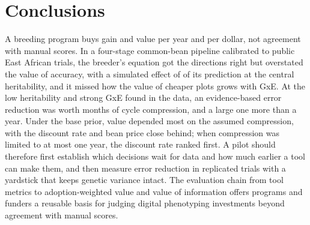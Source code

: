 \section{Conclusions}\label{sec:conclusions}

A breeding program buys gain and value per year and per dollar, not agreement with manual scores. In a four-stage common-bean pipeline calibrated to public East African trials, the breeder's equation got the directions right but overstated the value of accuracy, with a simulated effect of \NumBEratioHtwoTen of its prediction at the central heritability, and it missed how the value of cheaper plots grows with GxE. At the low heritability and strong GxE found in the data, an evidence-based error reduction was worth \NumExchMoHtwoTenErrTen months of cycle compression, and a large one more than a year. Under the base prior, value depended most on the assumed compression, with the discount rate and bean price close behind; when compression was limited to at most one year, the discount rate ranked first. A pilot should therefore first establish which decisions wait for data and how much earlier a tool can make them, and then measure error reduction in replicated trials with a yardstick that keeps genetic variance intact. The evaluation chain from tool metrics to adoption-weighted value and value of information offers programs and funders a reusable basis for judging digital phenotyping investments beyond agreement with manual scores.
